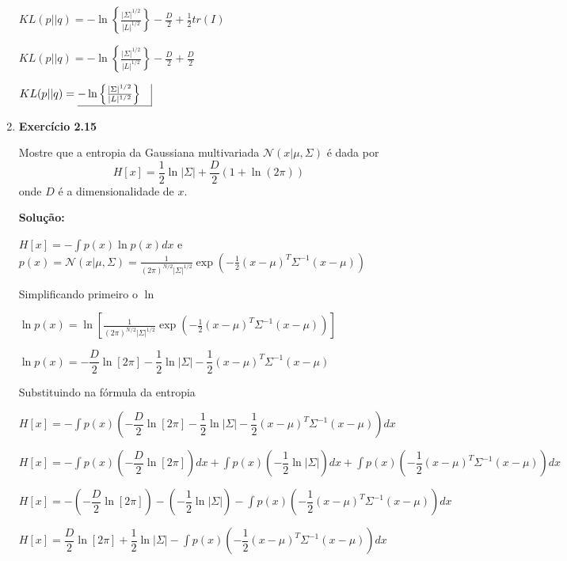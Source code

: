 \begin{enumerate}
    $ KL(p || q) = - \ln \left\{\frac{|\Sigma|^{1/2}}{|L|^{1/2}} \right\} - \frac{D}{2} + \frac{1}{2} tr\left(I\right)   $

    $ KL(p || q) = - \ln \left\{\frac{|\Sigma|^{1/2}}{|L|^{1/2}} \right\} - \frac{D}{2} + \frac{D}{2} $
    
    $ KL(p || q) = \underline{- \ln \left\{\frac{|\Sigma|^{1/2}}{|L|^{1/2}} \right\} \quad} \vline $




\item \textbf{Exercício 2.15} \par
Mostre que a entropia da Gaussiana multivariada $ \mathcal{N}(x|\mu, \Sigma) $ é dada por 
\begin{equation*}
    H[x] = \frac{1}{2} \ln |\Sigma| + \frac{D}{2} (1 + \ln(2\pi))
\end{equation*}
onde $ D $ é a dimensionalidade de $ x $.

\par
\textbf{Solução:}

$H[x] = - \int p(x) \ln p(x) dx$ e $p(x) = \mathcal{N}(x|\mu, \Sigma) = \frac{1}{(2\pi)^{N/2} |\Sigma|^{1/2}} \exp \left( -\frac{1}{2} (x - \mu)^T \Sigma^{-1} (x - \mu) \right)$ 

Simplificando primeiro o $\ln$

$\ln p(x) = \ln \left[  \frac{1}{(2\pi)^{N/2} |\Sigma|^{1/2}} \exp \left( -\frac{1}{2} (x - \mu)^T \Sigma^{-1} (x - \mu) \right)  \right]$

$\ln p(x) = -\dfrac{D}{2}\ln[2\pi] -\dfrac{1}{2}\ln|\Sigma| -\dfrac{1}{2}(x - \mu)^T \Sigma^{-1} (x - \mu) $

Substituindo na fórmula da entropia

$H[x] = - \int p(x) \left( -\dfrac{D}{2}\ln[2\pi] -\dfrac{1}{2}\ln|\Sigma| -\dfrac{1}{2}(x - \mu)^T \Sigma^{-1} (x - \mu) \right) dx$

$H[x] = - \int p(x) \left( -\dfrac{D}{2}\ln[2\pi] \right) dx + \int p(x)  \left(-\dfrac{1}{2}\ln|\Sigma| \right) dx + \int p(x)  \left( -\dfrac{1}{2}(x - \mu)^T \Sigma^{-1} (x - \mu) \right) dx$

$H[x] = - \left( -\dfrac{D}{2}\ln[2\pi] \right) - \left(-\dfrac{1}{2}\ln|\Sigma| \right) - \int p(x)  \left( -\dfrac{1}{2}(x - \mu)^T \Sigma^{-1} (x - \mu) \right) dx$

$H[x] = \dfrac{D}{2}\ln[2\pi] + \dfrac{1}{2}\ln|\Sigma| - \int p(x)  \left( -\dfrac{1}{2}(x - \mu)^T \Sigma^{-1} (x - \mu) \right) dx$


\end{enumerate}
